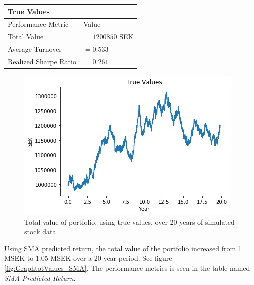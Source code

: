 \documentclass{LTHtwocol} %
\begin{document}
\begin{center}
 \begin{tabular}{||l l||} 
 \hline
 \textbf{True Values} & \\ [0.5ex] 
 \hline
 Performance Metric & Value\\ [0.5ex] 
 \hline\hline
 Total Value & $=1200850$ SEK \\ 
 \hline
 Average Turnover& $=0.533$ \\
 \hline
 Realized Sharpe Ratio & $=0.261$ \\  [1ex] 
 \hline
\end{tabular}
\end{center}
\begin{figure}[h]
	\centering
	\includegraphics[width=0.8\columnwidth]{Pics/GraphtotValues_TrueValues.jpg}
	\caption{Total value of portfolio, using true values, over 20 years of simulated stock data.}
	\label{fig:GraphtotValues_TrueValues} 
\end{figure}

Using SMA predicted return, the total value of the portfolio increased from 1 MSEK to 1.05 MSEK over a 20 year period. See figure \ref{fig:GraphtotValues_SMA}. The performance metrics is seen in the table named \textit{SMA Predicted Return}.
\end{document}

